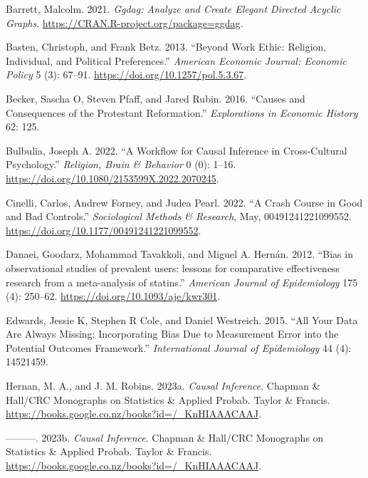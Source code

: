 \documentclass[
  singlecolumn]{report}
\newlength{\cslhangindent}
\newlength{\cslentryspacingunit} %
\newenvironment{CSLReferences}[2] %
 {%
  \setlength{\parindent}{0pt}
  \ifodd #1
  \let\oldpar\par
  \def\par{\hangindent=\cslhangindent\oldpar}
  \fi
  \setlength{\parskip}{#2\cslentryspacingunit}
 }%
 {}
\begin{document}
\hypertarget{refs}{}
\begin{CSLReferences}{1}{0}
\leavevmode{}%
Barrett, Malcolm. 2021. \emph{Ggdag: Analyze and Create Elegant Directed
Acyclic Graphs}. \url{https://CRAN.R-project.org/package=ggdag}.

\leavevmode{}%
Basten, Christoph, and Frank Betz. 2013. {``Beyond Work Ethic: Religion,
Individual, and Political Preferences.''} \emph{American Economic
Journal: Economic Policy} 5 (3): 67--91.
\url{https://doi.org/10.1257/pol.5.3.67}.

\leavevmode{}%
Becker, Sascha O, Steven Pfaff, and Jared Rubin. 2016. {``Causes and
Consequences of the Protestant Reformation.''} \emph{Explorations in
Economic History} 62: 125.

\leavevmode{}%
Bulbulia, Joseph A. 2022. {``A Workflow for Causal Inference in
Cross-Cultural Psychology.''} \emph{Religion, Brain \& Behavior} 0 (0):
1--16. \url{https://doi.org/10.1080/2153599X.2022.2070245}.

\leavevmode{}%
Cinelli, Carlos, Andrew Forney, and Judea Pearl. 2022. {``A Crash Course
in Good and Bad Controls.''} \emph{Sociological Methods \& Research},
May, 00491241221099552. \url{https://doi.org/10.1177/00491241221099552}.

\leavevmode{}%
Danaei, Goodarz, Mohammad Tavakkoli, and Miguel A. Hernán. 2012. {``Bias
in observational studies of prevalent users: lessons for comparative
effectiveness research from a meta-analysis of statins.''}
\emph{American Journal of Epidemiology} 175 (4): 250--62.
\url{https://doi.org/10.1093/aje/kwr301}.

\leavevmode{}%
Edwards, Jessie K, Stephen R Cole, and Daniel Westreich. 2015. {``All
Your Data Are Always Missing: Incorporating Bias Due to Measurement
Error into the Potential Outcomes Framework.''} \emph{International
Journal of Epidemiology} 44 (4): 14521459.

\leavevmode{}%
Hernan, M. A., and J. M. Robins. 2023a. \emph{Causal Inference}. Chapman
\& Hall/CRC Monographs on Statistics \& Applied Probab. Taylor \&
Francis. \url{https://books.google.co.nz/books?id=/_KnHIAAACAAJ}.

\leavevmode{}%
---------. 2023b. \emph{Causal Inference}. Chapman \& Hall/CRC
Monographs on Statistics \& Applied Probab. Taylor \& Francis.
\url{https://books.google.co.nz/books?id=/_KnHIAAACAAJ}.


\end{CSLReferences}
\end{document}
